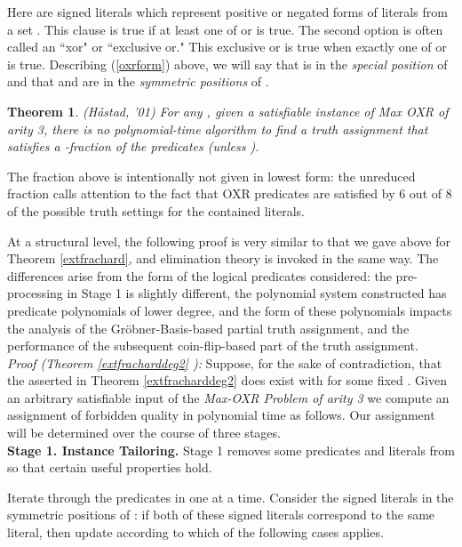\documentclass{article}
\newtheorem{theorem}{Theorem}[]
\begin{document}
Here  are signed literals which represent positive or negated forms of literals from a set . This clause is true if at least one of  or  is true.  The second option  is often called an ``xor" or ``exclusive or." This exclusive or is true when exactly one of  or  is true. Describing (\ref{oxrform}) above, we will say that  is in the \textit{special position} of  and that  and  are in the \textit{symmetric positions} of . 

\begin{theorem} \label{hastad2}(H{\aa}stad, '01)
For any , given a satisfiable instance of Max OXR of arity 3, there is no polynomial-time algorithm to find a truth assignment that satisfies a -fraction of the predicates (unless ). 
\end{theorem}

The fraction above is intentionally not given in lowest form: the unreduced fraction calls attention to the fact that OXR predicates are satisfied by 6 out of 8 of the possible truth settings for the contained literals.

At a structural level, the following proof is very similar to that we gave above for Theorem \ref{extfrachard}, and elimination theory is invoked in the same way.  The differences arise from the form of the logical predicates considered: the pre-processing in Stage 1 is slightly different, the polynomial system constructed has predicate polynomials of lower degree, and the form of these polynomials impacts the analysis of the Gr\"{o}bner-Basis-based partial truth assignment, and the performance of the subsequent coin-flip-based part of the truth assignment.\\

\noindent \textit{Proof (Theorem \ref{extfracharddeg2} ):}  Suppose, for the sake of contradiction, that the  asserted in Theorem \ref{extfracharddeg2} does exist with  for some fixed . Given an arbitrary satisfiable input  of the \textit{Max-OXR Problem of arity 3} we compute an assignment of forbidden quality in polynomial time as follows. Our assignment will be determined over the course of three stages. \\

\noindent \textbf{Stage 1. Instance Tailoring.} Stage 1 removes some predicates and literals from  so that certain useful properties hold. 

Iterate through the predicates in  one at a time.  Consider the signed literals in the symmetric positions of : if both of these signed literals correspond to the same literal, then update  according to which of the following cases applies.
\end{document}
